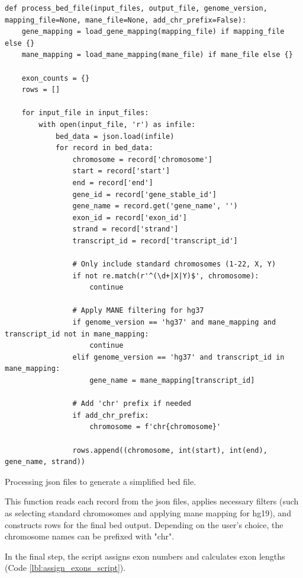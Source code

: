 \begin{longlisting}
\begin{verbatim}
def process_bed_file(input_files, output_file, genome_version, mapping_file=None, mane_file=None, add_chr_prefix=False):
    gene_mapping = load_gene_mapping(mapping_file) if mapping_file else {}
    mane_mapping = load_mane_mapping(mane_file) if mane_file else {}

    exon_counts = {}
    rows = []

    for input_file in input_files:
        with open(input_file, 'r') as infile:
            bed_data = json.load(infile)
            for record in bed_data:
                chromosome = record['chromosome']
                start = record['start']
                end = record['end']
                gene_id = record['gene_stable_id']
                gene_name = record.get('gene_name', '')
                exon_id = record['exon_id']
                strand = record['strand']
                transcript_id = record['transcript_id']

                # Only include standard chromosomes (1-22, X, Y)
                if not re.match(r'^(\d+|X|Y)$', chromosome):
                    continue

                # Apply MANE filtering for hg37
                if genome_version == 'hg37' and mane_mapping and transcript_id not in mane_mapping:
                    continue
                elif genome_version == 'hg37' and transcript_id in mane_mapping:
                    gene_name = mane_mapping[transcript_id]

                # Add 'chr' prefix if needed
                if add_chr_prefix:
                    chromosome = f'chr{chromosome}'

                rows.append((chromosome, int(start), int(end), gene_name, strand))
\end{verbatim}
\caption{Processing \ac{json} files to generate a simplified \ac{bed} file.}
\label{lbl:process_bed_script}
\end{longlisting}

This function reads each record from the \ac{json} files, applies necessary filters (such as selecting standard chromosomes and applying \ac{mane} mapping for \ac{hg19}), and constructs rows for the final \ac{bed} output. Depending on the user's choice, the chromosome names can be prefixed with "chr".

In the final step, the script assigns exon numbers and calculates exon lengths (Code \ref{lbl:assign_exons_script}).

